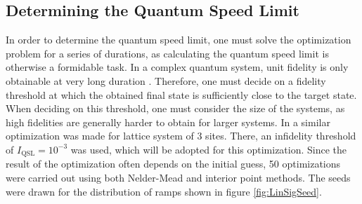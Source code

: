 \subsection{Determining the Quantum Speed Limit}
In order to determine the quantum speed limit, one must solve the optimization problem for a series of durations, as calculating the quantum speed limit is otherwise a formidable task. In a complex quantum system, unit fidelity is only obtainable at very long duration \cite{CITE}. Therefore, one must decide on a fidelity threshold at which the obtained final state is sufficiently close to the target state. When deciding on this threshold, one must consider the size of the systems, as high fidelities are generally harder to obtain for larger systems. In \cite{MajaJulie} a similar optimization was made for lattice system of 3 sites. There, an infidelity threshold of $I_{\mathrm{QSL}} = 10^{-3}$ was used, which will be adopted for this optimization.
Since the result of the optimization often depends on the initial guess, 50 optimizations were carried out using both Nelder-Mead and interior point methods. The seeds were drawn for the distribution of ramps shown in figure \ref{fig:LinSigSeed}. 

